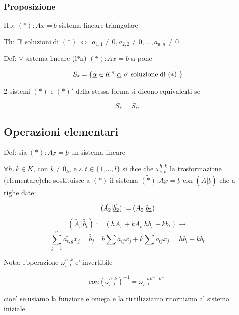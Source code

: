 \documentclass{article}
\begin{document}
\subsubsection{Proposizione}
\begin{flushleft}
	Hp: $(*):A\underbar{x}=\underbar{b}$ sistema lineare triangolare
\end{flushleft}
\begin{flushleft}
	Th: $\exists !$ soluzioni di $(*)$ $\iff$ $a_{1,1} \neq 0, a_{2,2} \neq 0,...,a_{n,n} \neq 0$
\end{flushleft}
\begin{flushleft}
	Def: $\forall$ sistema lineare (l*n) $(*):A \underbar{x}=\underbar{b}$ si pone
\end{flushleft}
\begin{equation*}
	S_*=\{\underbar{$\alpha$} \in K^n | \underbar{$\alpha$} \text{ e' soluzione di $(*)$ } \}
\end{equation*}
\begin{flushleft}
	2 sistemi $(*)$ e $(*)'$ della stessa forma si dicono equivalenti se
\end{flushleft}
\begin{equation*}
	S_*=S_{*'}
\end{equation*}
\subsection{Operazioni elementari}
\begin{flushleft}
	Def: sia $(*):A\underbar{x}=\underbar{b}$ un sistema lineare
\end{flushleft}
\begin{flushleft}
	$\forall h,k\in K$, con $k \neq 0_k$, e $s,t \in \{1,...,l \}$ si dice che $\omega^{h,k}_{s,t}$
	la trasformazione (elementare)che sostituisce a $(*)$ il sistema $\tilde{(*)}:\tilde{A} \underbar{x}=\tilde{\underbar{b}}$
	con $(\tilde{A}|\tilde{\underbar{b}})$ che a righe date:
\end{flushleft}
\begin{equation*}
	(\tilde{A_2}|\tilde{\underbar{$b_2$}}):=(A_2|\underbar{$b_2$})
\end{equation*}
\begin{equation*}
	(\tilde{A_t}|\tilde{b_t}):=(hA_s+kA_t|hb_s+kb_t)\to
\end{equation*}
\begin{equation*}
	\sum^n_{j=1} \tilde{a_{t,g}}x_j=\tilde{b_j} \quad h\sum a_{ij}x_j+k\sum a_{tj}x_j=hb_j+kb_t
\end{equation*}
\begin{flushleft}
	Nota: l'operazione $\omega^{h,k}_{s,t}$ e' invertibile
\end{flushleft}
\begin{equation*}
	con(\omega^{h,k}_{s,t})^{-1}=\omega^{-hk^{-1},k^{-1}}_{s,t}
\end{equation*}
\begin{flushleft}
	cioe' se usiamo la funzione e omega e la riutilizziamo ritorniamo al sistema iniziale
\end{flushleft}
\end{document}
